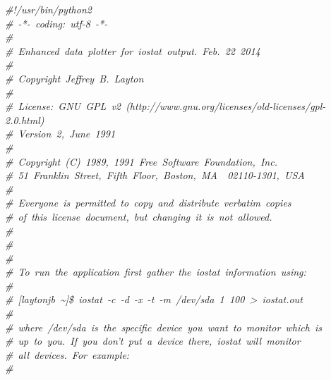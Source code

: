 \noindent
\mbox{}\textit{\#!/usr/bin/python2} \\
\mbox{}\textit{\#\ -*-\ coding:\ utf-8\ -*-} \\
\mbox{}\textit{\#} \\
\mbox{}\textit{\#\ Enhanced\ data\ plotter\ for\ iostat\ output.\ Feb.\ 22\ 2014} \\
\mbox{}\textit{\#} \\
\mbox{}\textit{\#\ Copyright\ Jeffrey\ B.\ Layton} \\
\mbox{}\textit{\#} \\
\mbox{}\textit{\#\ License:\ GNU\ GPL\ v2\ (http://www.gnu.org/licenses/old-licenses/gpl-2.0.html)} \\
\mbox{}\textit{\#\ Version\ 2,\ June\ 1991} \\
\mbox{}\textit{\#} \\
\mbox{}\textit{\#\ Copyright\ (C)\ 1989,\ 1991\ Free\ Software\ Foundation,\ Inc.\ \ } \\
\mbox{}\textit{\#\ 51\ Franklin\ Street,\ Fifth\ Floor,\ Boston,\ MA\ \ 02110-1301,\ USA} \\
\mbox{}\textit{\#} \\
\mbox{}\textit{\#\ Everyone\ is\ permitted\ to\ copy\ and\ distribute\ verbatim\ copies} \\
\mbox{}\textit{\#\ of\ this\ license\ document,\ but\ changing\ it\ is\ not\ allowed.} \\
\mbox{}\textit{\#} \\
\mbox{}\textit{\#} \\
\mbox{}\textit{\#} \\
\mbox{}\textit{\#\ To\ run\ the\ application\ first\ gather\ the\ iostat\ information\ using:} \\
\mbox{}\textit{\#} \\
\mbox{}\textit{\#\ [laytonjb\ \textasciitilde{}]\$\ iostat\ -c\ -d\ -x\ -t\ -m\ /dev/sda\ 1\ 100\ \textgreater{}\ iostat.out} \\
\mbox{}\textit{\#} \\
\mbox{}\textit{\#\ where\ /dev/sda\ is\ the\ specific\ device\ you\ want\ to\ monitor\ which\ is} \\
\mbox{}\textit{\#\ up\ to\ you.\ If\ you\ don't\ put\ a\ device\ there,\ iostat\ will\ monitor} \\
\mbox{}\textit{\#\ all\ devices.\ For\ example:} \\
\mbox{}\textit{\#} \\
